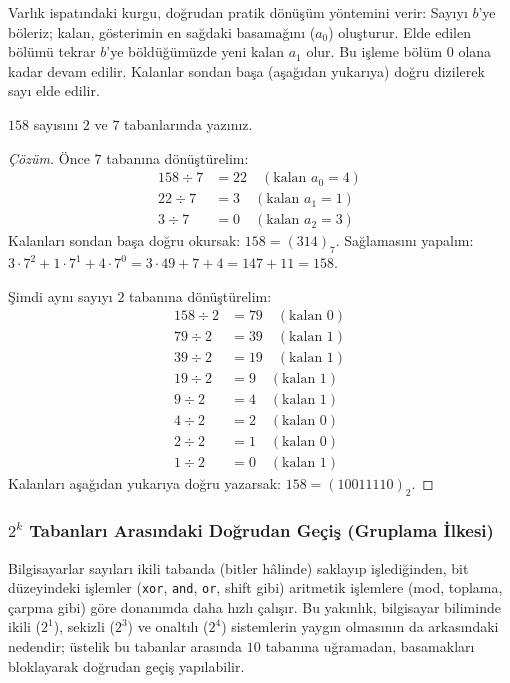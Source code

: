 Varlık ispatındaki kurgu, doğrudan pratik dönüşüm yöntemini verir:
Sayıyı $b$'ye böleriz; kalan, gösterimin en sağdaki basamağını ($a_0$) oluşturur. Elde edilen bölümü tekrar $b$'ye böldüğümüzde yeni kalan $a_1$ olur. Bu işleme bölüm $0$ olana kadar devam edilir. Kalanlar sondan başa (aşağıdan yukarıya) doğru dizilerek sayı elde edilir.

\begin{example}
$158$ sayısını $2$ ve $7$ tabanlarında yazınız.
\end{example}

\begin{proof}[Çözüm]
Önce $7$ tabanına dönüştürelim:
\begin{align*}
158 \div 7 &= 22 \quad (\text{kalan } a_0 = 4) \\
22 \div 7 &= 3 \quad (\text{kalan } a_1 = 1) \\
3 \div 7 &= 0 \quad (\text{kalan } a_2 = 3)
\end{align*}
Kalanları sondan başa doğru okursak: $158 = (314)_7$. Sağlamasını yapalım:
$3 \cdot 7^2 + 1 \cdot 7^1 + 4 \cdot 7^0 = 3 \cdot 49 + 7 + 4 = 147 + 11 = 158$.

Şimdi aynı sayıyı $2$ tabanına dönüştürelim:
\begin{align*}
158 \div 2 &= 79 \quad (\text{kalan } 0) \\
79 \div 2 &= 39 \quad (\text{kalan } 1) \\
39 \div 2 &= 19 \quad (\text{kalan } 1) \\
19 \div 2 &= 9 \quad (\text{kalan } 1) \\
9 \div 2 &= 4 \quad (\text{kalan } 1) \\
4 \div 2 &= 2 \quad (\text{kalan } 0) \\
2 \div 2 &= 1 \quad (\text{kalan } 0) \\
1 \div 2 &= 0 \quad (\text{kalan } 1)
\end{align*}
Kalanları aşağıdan yukarıya doğru yazarsak: $158 = (10011110)_2$.
\end{proof}

\subsubsection{$2^k$ Tabanları Arasındaki Doğrudan Geçiş (Gruplama İlkesi)}

Bilgisayarlar sayıları ikili tabanda (bitler hâlinde) saklayıp işlediğinden, bit düzeyindeki işlemler (\texttt{xor}, \texttt{and}, \texttt{or}, shift gibi) aritmetik işlemlere (mod, toplama, çarpma gibi) göre donanımda daha hızlı çalışır. Bu yakınlık, bilgisayar biliminde ikili ($2^1$), sekizli ($2^3$) ve onaltılı ($2^4$) sistemlerin yaygın olmasının da arkasındaki nedendir; üstelik bu tabanlar arasında $10$ tabanına uğramadan, basamakları bloklayarak doğrudan geçiş yapılabilir.

